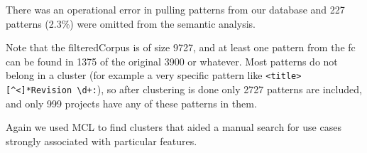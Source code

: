 There was an operational error in pulling  patterns from our database and 227 patterns (2.3\%) were omitted from the semantic analysis. 

Note that the filteredCorpus is of size 9727, and at least one pattern from the fc can be found in 1375 of the original 3900 or whatever.  Most patterns do not belong in a cluster (for example a very specific pattern like \verb!<title>[^<]*Revision \d+:!), so after clustering is done only 2727 patterns are included, and only 999 projects have any of these patterns in them.




Again we used MCL to find clusters that aided a manual search for use cases strongly associated with particular features.











